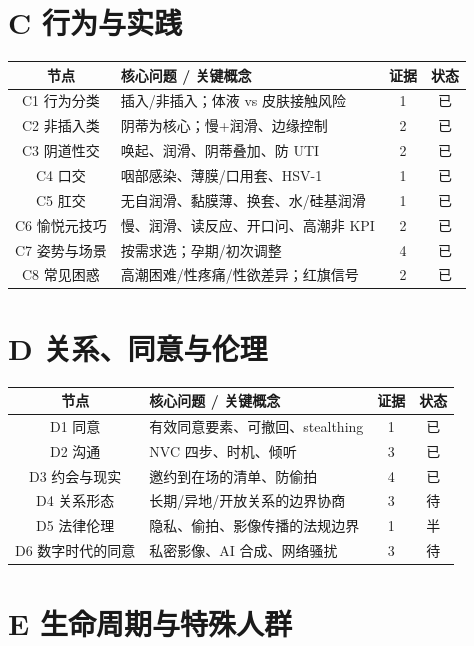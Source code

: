 \documentclass[12pt,UTF8,openany]{ctexbook}
\begin{document}
\section{C 行为与实践}

\begin{tabularx}{\linewidth}{C X c c}
\toprule
\textbf{节点} & \textbf{核心问题 / 关键概念} & \textbf{证据} & \textbf{状态} \\
\midrule
C1 行为分类 & 插入/非插入；体液 vs 皮肤接触风险 & 1 & 已 \\
C2 非插入类 & 阴蒂为核心；慢+润滑、边缘控制 & 2 & 已 \\
C3 阴道性交 & 唤起、润滑、阴蒂叠加、防 UTI & 2 & 已 \\
C4 口交 & 咽部感染、薄膜/口用套、HSV-1 & 1 & 已 \\
C5 肛交 & 无自润滑、黏膜薄、换套、水/硅基润滑 & 1 & 已 \\
C6 愉悦元技巧 & 慢、润滑、读反应、开口问、高潮非 KPI & 2 & 已 \\
C7 姿势与场景 & 按需求选；孕期/初次调整 & 4 & 已 \\
C8 常见困惑 & 高潮困难/性疼痛/性欲差异；红旗信号 & 2 & 已 \\
\bottomrule
\end{tabularx}

\section{D 关系、同意与伦理}

\begin{tabularx}{\linewidth}{C X c c}
\toprule
\textbf{节点} & \textbf{核心问题 / 关键概念} & \textbf{证据} & \textbf{状态} \\
\midrule
D1 同意 & 有效同意要素、可撤回、stealthing & 1 & 已 \\
D2 沟通 & NVC 四步、时机、倾听 & 3 & 已 \\
D3 约会与现实 & 邀约到在场的清单、防偷拍 & 4 & 已 \\
D4 关系形态 & 长期/异地/开放关系的边界协商 & 3 & 待 \\
D5 法律伦理 & 隐私、偷拍、影像传播的法规边界 & 1 & 半 \\
D6 数字时代的同意 & 私密影像、AI 合成、网络骚扰 & 3 & 待 \\
\bottomrule
\end{tabularx}

\section{E 生命周期与特殊人群}
\end{document}
